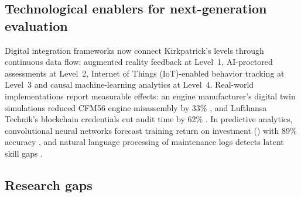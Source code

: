 \subsection{Technological enablers for next-generation evaluation}
\label{subsec:tech-enablers}

Digital integration frameworks now connect Kirkpatrick's levels through continuous data flow: augmented reality feedback at Level~1, AI-proctored assessments at Level~2, Internet of Things (IoT)-enabled behavior tracking at Level~3 and causal machine-learning analytics at Level~4. Real-world implementations report measurable effects: an engine manufacturer's digital twin simulations reduced CFM56 engine misassembly by 33\% \parencite{Garcia2024}, and Lufthansa Technik's blockchain credentials cut audit time by 62\% \parencite{IATABlockchain2025}. In predictive analytics, convolutional neural networks forecast training return on investment (\ROI{}) with 89\% accuracy \parencite{Peterson2025}, and natural language processing of maintenance logs detects latent skill gaps \parencite{BoeingAIR2024}. 

\subsection{Research gaps}
\label{subsec:gaps}

